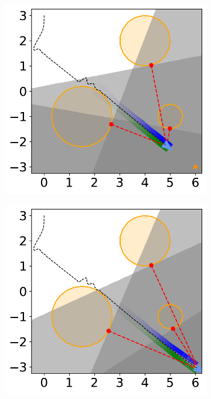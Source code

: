 \begin{figure}[H]
    \begin{subfigure}{0.35\textwidth}
        \centering
        \includegraphics[width=\textwidth]{figures/Simulations/sim1circles/frame_8.pdf}
    \end{subfigure}%
    \hspace{1em}
    \begin{subfigure}{0.35\textwidth}
        \centering
        \includegraphics[width=\textwidth]{figures/Simulations/sim1circles/frame_9.pdf}

\end{subfigure}
\end{figure}
